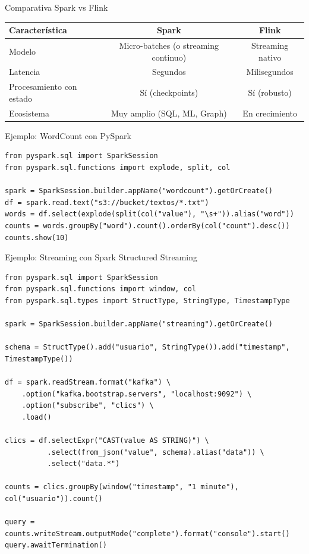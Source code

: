\documentclass[aspectratio=169, 10pt, xcolor=table]{beamer}
\begin{document}
\begin{frame}{Comparativa Spark vs Flink}
    \begin{table}
        \centering
        \begin{tabular}{l|c|c}
            \toprule
            Característica & Spark & Flink \\
            \midrule
            Modelo & Micro-batches (o streaming continuo) & Streaming nativo \\
            Latencia & Segundos & Milisegundos \\
            Procesamiento con estado & Sí (checkpoints) & Sí (robusto) \\
            Ecosistema & Muy amplio (SQL, ML, Graph) & En crecimiento \\
            \bottomrule
        \end{tabular}
    \end{table}
\end{frame}

\begin{frame}[fragile]{Ejemplo: WordCount con PySpark}
    \begin{lstlisting}[style=python]
from pyspark.sql import SparkSession
from pyspark.sql.functions import explode, split, col

spark = SparkSession.builder.appName("wordcount").getOrCreate()
df = spark.read.text("s3://bucket/textos/*.txt")
words = df.select(explode(split(col("value"), "\s+")).alias("word"))
counts = words.groupBy("word").count().orderBy(col("count").desc())
counts.show(10)
    \end{lstlisting}
\end{frame}

\begin{frame}[fragile]{Ejemplo: Streaming con Spark Structured Streaming}
    \begin{lstlisting}[style=python]
from pyspark.sql import SparkSession
from pyspark.sql.functions import window, col
from pyspark.sql.types import StructType, StringType, TimestampType

spark = SparkSession.builder.appName("streaming").getOrCreate()

schema = StructType().add("usuario", StringType()).add("timestamp", TimestampType())

df = spark.readStream.format("kafka") \
    .option("kafka.bootstrap.servers", "localhost:9092") \
    .option("subscribe", "clics") \
    .load()

clics = df.selectExpr("CAST(value AS STRING)") \
          .select(from_json("value", schema).alias("data")) \
          .select("data.*")

counts = clics.groupBy(window("timestamp", "1 minute"), col("usuario")).count()

query = counts.writeStream.outputMode("complete").format("console").start()
query.awaitTermination()
    \end{lstlisting}
\end{frame}
\end{document}
